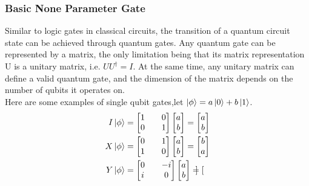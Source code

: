 \subsubsection{Basic None Parameter Gate}
Similar to logic gates in classical circuits, the transition of a quantum circuit state can be achieved through quantum gates. Any quantum gate can be represented by a matrix, the only limitation being that its matrix representation U is a unitary matrix, i.e. ${UU^{\dagger}=I}$.
At the same time, any unitary matrix can define a valid quantum gate, and the dimension of the matrix depends on the number of qubits it operates on.\\
Here are some examples of single qubit gates,let $\ket{\phi}=a\ket{0}+b\ket{1}$.\\
\begin{align*}
    I\ket{\phi} & =\begin{bmatrix}
        1 &  & 0 \\
        0 &  & 1
    \end{bmatrix}\begin{bmatrix}
        a \\
        b
    \end{bmatrix}=\begin{bmatrix}
        a \\
        b
    \end{bmatrix}                                        %
    \\
    X\ket{\phi} & =\begin{bmatrix}
        0 &  & 1 \\
        1 &  & 0
    \end{bmatrix}\begin{bmatrix}
        a \\
        b
    \end{bmatrix}=\begin{bmatrix}
        b \\
        a
    \end{bmatrix}                                        %
    \\
    Y\ket{\phi} & =\begin{bmatrix}
        0 &  & -i \\
        i &  & 0
    \end{bmatrix}\begin{bmatrix}
        a \\
        b
    \end{bmatrix}=\begin{bmatrix}

\end{bmatrix}
\end{align*}
